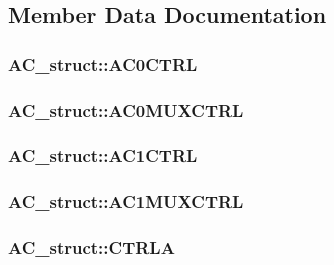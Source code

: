 \subsection{Member Data Documentation}
\hypertarget{struct_a_c__struct_a735749b8d1bb05682d363f3ac4b3f9a7}{
\subsubsection[{AC0CTRL}]{ {\bf AC\_\-struct::AC0CTRL}}}
\label{struct_a_c__struct_a735749b8d1bb05682d363f3ac4b3f9a7}
\hypertarget{struct_a_c__struct_a1d590cfc0a8de5ed78d5afe222cadf7e}{
\subsubsection[{AC0MUXCTRL}]{ {\bf AC\_\-struct::AC0MUXCTRL}}}
\label{struct_a_c__struct_a1d590cfc0a8de5ed78d5afe222cadf7e}
\hypertarget{struct_a_c__struct_a87a05f04707d487255222f467508dbca}{
\subsubsection[{AC1CTRL}]{ {\bf AC\_\-struct::AC1CTRL}}}
\label{struct_a_c__struct_a87a05f04707d487255222f467508dbca}
\hypertarget{struct_a_c__struct_a042c0a43ce91331ff012ec6acf5b7b49}{
\subsubsection[{AC1MUXCTRL}]{ {\bf AC\_\-struct::AC1MUXCTRL}}}
\label{struct_a_c__struct_a042c0a43ce91331ff012ec6acf5b7b49}
\hypertarget{struct_a_c__struct_aba3a132516f20876ebabdfec5110dbb2}{
\subsubsection[{CTRLA}]{ {\bf AC\_\-struct::CTRLA}}}
